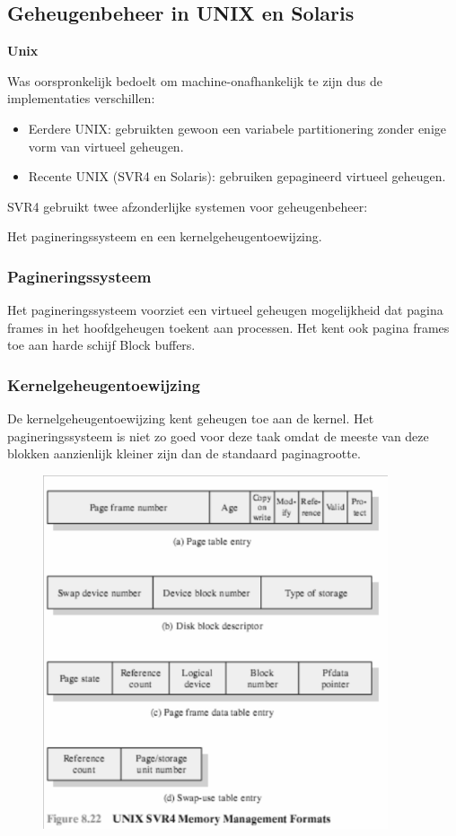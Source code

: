 \subsection{Geheugenbeheer in UNIX en Solaris }

\textbf{Unix}

Was oorspronkelijk bedoelt om machine-onafhankelijk te zijn dus de implementaties verschillen:

\begin{itemize}
\item Eerdere UNIX: gebruikten gewoon een variabele partitionering zonder enige vorm van virtueel geheugen.
\item Recente UNIX (SVR4 en Solaris): gebruiken gepagineerd virtueel geheugen.
\end{itemize}

SVR4 gebruikt twee afzonderlijke systemen voor geheugenbeheer: 

Het pagineringssysteem en een kernelgeheugentoewijzing.

\subsubsection{Pagineringssysteem}

Het pagineringssysteem voorziet een virtueel geheugen mogelijkheid dat pagina frames in het hoofdgeheugen toekent aan processen. Het kent ook pagina frames toe aan harde schijf Block buffers.

\subsubsection{Kernelgeheugentoewijzing}

De kernelgeheugentoewijzing kent geheugen toe aan de kernel. Het pagineringssysteem is niet zo goed voor deze taak omdat de meeste van deze blokken aanzienlijk kleiner zijn dan de standaard paginagrootte.

\begin{figure}[htp]
    \centering
            \includegraphics[width=4in]{img/Kernelgeheugentoewijzing}
        \caption{}
    \label{fig:}
\end{figure}


